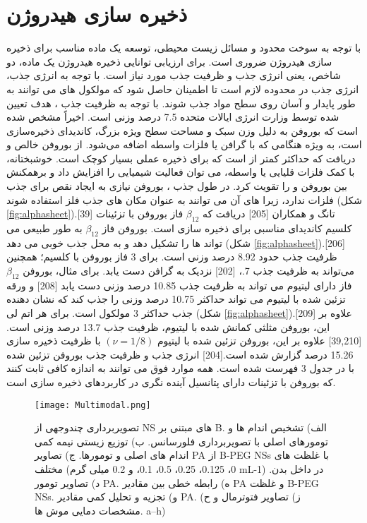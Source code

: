 \section{ذخیره سازی هیدروژن}
با توجه به سوخت محدود و مسائل زیست محیطی، توسعه یک ماده مناسب برای ذخیره سازی هیدروژن ضروری است. برای ارزیابی توانایی ذخیره هیدروژن یک ماده، دو شاخص، یعنی انرژی جذب و ظرفیت جذب  مورد نیاز است. با توجه به انرژی جذب، انرژی جذب در محدوده  لازم است تا اطمینان حاصل شود که مولکول های  می توانند به طور پایدار و آسان روی سطح مواد جذب شوند. با توجه به ظرفیت جذب ، هدف تعیین شده توسط وزارت انرژی ایالات متحده 7.5 درصد وزنی است. اخیراً مشخص شده است که بوروفن به دلیل وزن سبک و مساحت سطح ویژه بزرگ، کاندیدای ذخیره‌سازی  است، به ویژه هنگامی که با گرافن یا فلزات واسطه اضافه می‌شود. از بوروفن خالص و دریافت که حداکثر کمتر از  است که برای ذخیره عملی  بسیار کوچک است. خوشبختانه، با کمک فلزات قلیایی یا واسطه، می توان فعالیت شیمیایی را افزایش داد و برهمکنش بین بوروفن و  را تقویت کرد. در طول جذب ، بوروفن نیازی به ایجاد نقص برای جذب فلزات ندارد، زیرا  های آن می توانند به عنوان مکان های جذب فلز استفاده شوند (شکل \ref{fig:alphasheet}).\cite{shangTwoDimensionalBoron2018}[39] تانگ و همکاران \cite{tangTheoreticalInvestigationCalcium2018}[205] دریافت که $\beta_{12}$ فاز بوروفن با تزئینات کلسیم کاندیدای مناسبی برای ذخیره سازی  است. بوروفن فاز $\beta_{12}$ به طور طبیعی می تواند  ها را تشکیل دهد و به  محل جذب خوبی می دهد (شکل \ref{fig:alphasheet}).[206] ظرفیت جذب  حدود 8.92 درصد وزنی است. برای 3 فاز بوروفن با کلسیم؛ همچنین می‌تواند به ظرفیت جذب  7.، [202] نزدیک به گرافن دست یابد. برای مثال، بوروفن $\beta_{12}$ فاز دارای لیتیوم می تواند به ظرفیت جذب  10.85 درصد وزنی دست یابد \cite{liuLiDecorated12BorophenePotential2017}[208] و ورقه تزئین شده با لیتیوم می تواند حداکثر 10.75 درصد وزنی  را جذب کند که نشان دهنده جذب حداکثر 3 مولکول  است. برای هر اتم لی (شکل \ref{fig:alphasheet}).\cite{erDFTStudyPlanar2009}[209] علاوه بر این، بوروفن مثلثی کمانش شده با لیتیوم، ظرفیت جذب  13.7 درصد وزنی است.\cite{shangTwoDimensionalBoron2018, liHighHydrogenStorage2017}[39,210] علاوه بر این، بوروفن تزئین شده با لیتیوم $(\nu= 1/8)$ با ظرفیت ذخیره سازی  15.26 درصد گزارش شده است.\cite{liUltrahighCapacityMolecularHydrogen2015}[204] انرژی جذب و ظرفیت جذب  بوروفن تزئین شده با  در جدول 3 فهرست شده است. همه موارد فوق می توانند به اندازه کافی ثابت کنند که بوروفن با تزئینات  دارای پتانسیل آینده نگری در کاربردهای ذخیره سازی  است.
\begin{figure*}
    \centering
    \texttt{[image: Multimodal.png]}
    \caption{تصویربرداری چندوجهی از NS های مبتنی بر B. الف) تشخیص اندام ها و تومورهای اصلی با تصویربرداری فلورسانس. ب) توزیع زیستی نیمه کمی اندام های اصلی و تومورها. ج) تصاویر PA از B-PEG NSs با غلظت های مختلف (0، 0.125، 0.25، 0.5، 0.1، و 0.2 میلی گرم mL-1) در داخل بدن. د) تصاویر تومور PA. ه) رابطه خطی بین مقادیر PA و غلظت B-PEG NSs. و) تجزیه و تحلیل کمی مقادیر PA. ز) تصاویر فتوترمال و ح) مشخصات دمایی موش ها. a–h)}
    \label{fig:Multimodal}
\end{figure*}
